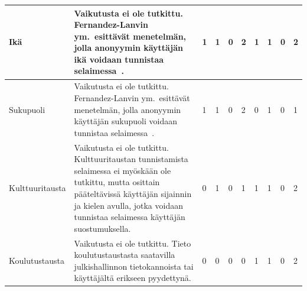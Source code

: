 \documentclass[finnish, 12pt, a4paper, elec, utf8, a-1b, online]{aaltothesis}
\begin{document}
{\begin{longtable}{p{2.5cm}|p{6cm}|p{0.5cm}p{0.5cm}p{0.5cm}|p{0.5cm}|p{0.5cm}p{0.5cm}p{0.5cm}|p{0.5cm}|}
    \midrule
    Ikä                                     & Vaikutusta ei ole tutkittu. Fernandez-Lanvin ym.\ esittävät menetelmän, jolla anonyymin käyttäjän ikä voidaan tunnistaa selaimessa~\cite{fernandez2018dimension}.                                                                                                                                                                 & 1                                          & 1                                   & 0                                      & 2                            & 1                                               & 1                                         & 0                                         & 2                            \\
    \midrule
    Sukupuoli                               & Vaikutusta ei ole tutkittu. Fernandez-Lanvin ym.\ esittävät menetelmän, jolla anonyymin käyttäjän sukupuoli voidaan tunnistaa selaimessa~\cite{fernandez2018dimension}.                                                                                                                                                           & 1                                          & 1                                   & 0                                      & 2                            & 0                                               & 1                                         & 0                                         & 1                            \\
    \midrule
    Kulttuuritausta                         & Vaikutusta ei ole tutkittu. Kulttuuritaustan tunnistamista selaimessa ei myöskään ole tutkittu, mutta osittain pääteltävissä käyttäjän sijainnin ja kielen avulla, jotka voidaan tunnistaa selaimessa käyttäjän suostumuksella.                                                                                                   & 0                                          & 1                                   & 0                                      & 1                            & 1                                               & 1                                         & 0                                         & 2                            \\
    \midrule
    Koulutustausta                          & Vaikutusta ei ole tutkittu. Tieto koulutustaustasta saatavilla julkishallinnon tietokannoista tai käyttäjältä erikseen pyydettynä.                                                                                                                                                                                                & 0                                          & 0                                   & 0                                      & 0                            & 1                                               & 1                                         & 0                                         & 2                            \\

\end{longtable}}
\end{document}
